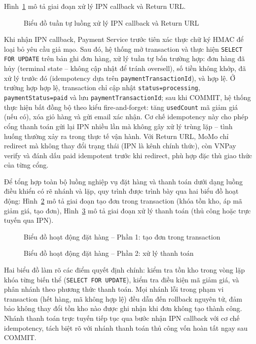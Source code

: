 \clearpage
Hình~\ref{fig:seq_checkout_ipn} mô tả giai đoạn xử lý IPN callback và Return URL.

\begin{figure}[H]
  \centering
  \caption{Biểu đồ tuần tự luồng xử lý IPN callback và Return URL}
  \label{fig:seq_checkout_ipn}
\end{figure}

Khi nhận IPN callback, Payment Service trước tiên xác thực chữ ký HMAC để loại bỏ yêu cầu giả mạo. Sau đó, hệ thống mở transaction và thực hiện \texttt{SELECT FOR UPDATE} trên bản ghi đơn hàng, xử lý tuần tự bốn trường hợp: đơn hàng đã hủy (terminal state -- không cập nhật để tránh oversell), số tiền không khớp, đã xử lý trước đó (idempotency dựa trên \texttt{paymentTransactionId}), và hợp lệ. Ở trường hợp hợp lệ, transaction chỉ cập nhật \texttt{status=processing}, \texttt{paymentStatus=paid} và lưu \texttt{paymentTransactionId}; sau khi COMMIT, hệ thống thực hiện bất đồng bộ theo kiểu fire-and-forget: tăng \texttt{usedCount} mã giảm giá (nếu có), xóa giỏ hàng và gửi email xác nhận. Cơ chế idempotency này cho phép cổng thanh toán gửi lại IPN nhiều lần mà không gây xử lý trùng lặp -- tình huống thường xảy ra trong thực tế vận hành. Với Return URL, MoMo chỉ redirect mà không thay đổi trạng thái (IPN là kênh chính thức), còn VNPay verify và đánh dấu paid idempotent trước khi redirect, phù hợp đặc thù giao thức của từng cổng.

Để tổng hợp toàn bộ luồng nghiệp vụ đặt hàng và thanh toán dưới dạng luồng điều khiển có rẽ nhánh và lặp, quy trình được trình bày qua hai biểu đồ hoạt động: Hình~\ref{fig:activity_checkout_1} mô tả giai đoạn tạo đơn trong transaction (khóa tồn kho, áp mã giảm giá, tạo đơn), Hình~\ref{fig:activity_checkout_2} mô tả giai đoạn xử lý thanh toán (thủ công hoặc trực tuyến qua IPN).

\begin{figure}[H]
  \centering
  \caption{Biểu đồ hoạt động đặt hàng -- Phần 1: tạo đơn trong transaction}
  \label{fig:activity_checkout_1}
\end{figure}

\begin{figure}[H]
  \centering
  \caption{Biểu đồ hoạt động đặt hàng -- Phần 2: xử lý thanh toán}
  \label{fig:activity_checkout_2}
\end{figure}

Hai biểu đồ làm rõ các điểm quyết định chính: kiểm tra tồn kho trong vòng lặp khóa từng biến thể (\texttt{SELECT FOR UPDATE}), kiểm tra điều kiện mã giảm giá, và phân nhánh theo phương thức thanh toán. Mọi nhánh lỗi trong phạm vi transaction (hết hàng, mã không hợp lệ) đều dẫn đến rollback nguyên tử, đảm bảo không thay đổi tồn kho nào được ghi nhận khi đơn không tạo thành công. Nhánh thanh toán trực tuyến tiếp tục qua bước nhận IPN callback với cơ chế idempotency, tách biệt rõ với nhánh thanh toán thủ công vốn hoàn tất ngay sau COMMIT.

